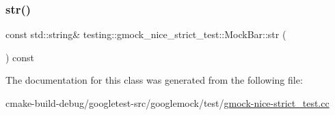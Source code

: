 \mbox{\label{classtesting_1_1gmock__nice__strict__test_1_1MockBar_adc0fb56c042e95e1a459bb007e813169}} 
\subsubsection{\texorpdfstring{str()}{str()}}
{\footnotesize\ttfamily const std\+::string\& testing\+::gmock\+\_\+nice\+\_\+strict\+\_\+test\+::\+Mock\+Bar\+::str (\begin{DoxyParamCaption}{ }\end{DoxyParamCaption}) const\hspace{0.3cm}{\ttfamily [inline]}}



The documentation for this class was generated from the following file\+:\begin{DoxyCompactItemize}
\item 
cmake-\/build-\/debug/googletest-\/src/googlemock/test/\mbox{\hyperlink{gmock-nice-strict__test_8cc}{gmock-\/nice-\/strict\+\_\+test.\+cc}}\end{DoxyCompactItemize}
